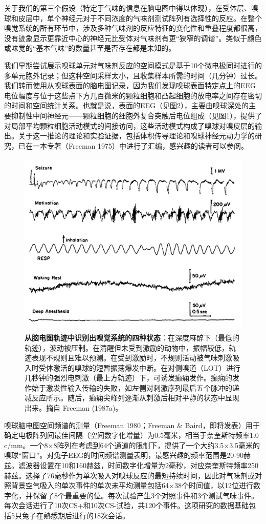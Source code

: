 \documentclass[a4paper,12pt]{article}
\newcommand{\longcaption}[2]{\caption[#1]{\textbf{#1}：#2}}
\begin{document}
关于我们的第三个假设（特定于气味的信息在脑电图中得以体现），在受体层、嗅球和皮层中，单个神经元对于不同浓度的气味剂测试阵列有选择性的反应。在整个嗅觉系统的所有环节中，涉及多种气味剂的反应特征的变化性和重叠程度都很高，没有迹象显示更靠近中心的神经元比受体对气味剂有更“狭窄的调谐”。类似于颜色或味觉的“基本气味”的数量甚至是否存在都是未知的。

我们早期尝试展示嗅球单元对气味剂反应的空间模式是基于10个微电极同时进行的多单元胞外记录；但这种空间采样太小，且收集样本所需的时间（几分钟）过长。我们转而使用从嗅球表面的脑电图记录，因为我们发现嗅球表面特定点上的EEG电位幅度与位于这些点下方几百微米的颗粒细胞和凸起细胞的放电率之间存在密切的时间和空间统计关系。也就是说，表面的EEG（见图2），主要由嗅球深处的主要抑制性中间神经元——颗粒细胞的细胞外复合突触后电位组成（见图1），提供了对局部平均颗粒细胞活动模式的间接访问，这些活动模式构成了嗅球对嗅皮层的输出。关于这一推论的理论和实验证据，包括体积传导理论和嗅球神经元动力学的研究，已在一本专著（Freeman 1975）中进行了汇编，感兴趣的读者可以参阅。

\begin{figure}[ht]
    \centering
    \includegraphics[height=3.5in]{images/fig2.jpg}
    \longcaption{从脑电图轨迹中识别出嗅觉系统的四种状态}{在深度麻醉下（最低的轨迹），波动被压制。在清醒但未受到激励的动物中，振幅较低，轨迹表现不规则且难以预测。在受到激励时，不规则活动被气味刺激吸入时受体激活的嗅球的短暂振荡爆发中断。在对侧嗅道（LOT）进行几秒钟的强烈电刺激（最上方轨迹）下，可诱发癫痫发作。癫痫的发作始于激发性输入传输的失败，如左侧对刺激序列最后五个脉冲的递减反应所示。随后，癫痫尖峰列逐渐从刺激后相对平静的状态中显现出来。摘自 Freeman (1987a)。}
\end{figure}

嗅球脑电图空间频谱的测量（Freeman 1980；Freeman \& Baird，即将发表）用于确定电极阵列间最佳间隔（空间数字化增量）为0.5毫米，相当于奈奎斯特频率1.0 c/mm。一个8×8阵列在考虑到64个通道的限制下，提供了一个大约3.5×3.5毫米的嗅球“窗口”。对兔子EEG的时间频谱测量表明，最感兴趣的频率范围是20-90赫兹。滤波器设置在10和160赫兹，时间数字化增量为2毫秒，对应奈奎斯特频率250赫兹。选择了76毫秒作为单次吸入对嗅球反应的最短持续时间，因此对气味剂或对照背景空气吸入的单次事件的单次未平均测量包括64×38个时间值，以12位进行数字化，并保留了8个最重要的位。每次试验产生3个对照事件和3个测试气味事件。每次会话进行了10次CS+和10次CS-试验，共120个事件。这项研究的数据基础包括5只兔子在熟悉期后进行的18次会话。
\end{document}
